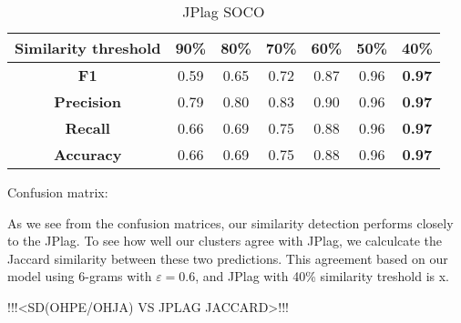 \begin{table}[ht]
\centering
\caption{JPlag SOCO}
\label{tbl-jplag-soco}
\begin{tabular}{|c||c|c|c|c|c|c|} \hline
\bf Similarity threshold & 90\% & 80\% & 70\% & 60\% & 50\% & 40\% \\ \hline
\bf F1                  & 0.59   &  0.65   &  0.72   &  0.87   &  0.96   & \bf 0.97    \\ \hline
\bf Precision           & 0.79    &  0.80   &  0.83   &  0.90   & 0.96    &  \bf 0.97   \\ \hline
\bf Recall              &  0.66   &  0.69    &  0.75   & 0.88    &  0.96   & \bf 0.97     \\ \hline
\bf Accuracy            &  0.66   &  0.69   & 0.75    &  0.88   &  0.96   & \bf 0.97   \\ \hline
\end{tabular}
\end{table}

\newpage


Confusion matrix:

\begin{table}[ht]
\centering
\caption{Confusion matrix for the best performing JPlag (sim 40\%)}
\label{tbl-jplag-soco-conf}
\end{table}

As we see from the confusion matrices, our similarity detection performs closely to the JPlag. To see how well our clusters agree with JPlag, we calculcate the Jaccard similarity between these two predictions. This agreement based on our model using 6-grams with $\varepsilon = 0.6$, and JPlag with 40\% similarity treshold is x.

!!!<SD(OHPE/OHJA) VS JPLAG JACCARD>!!!

